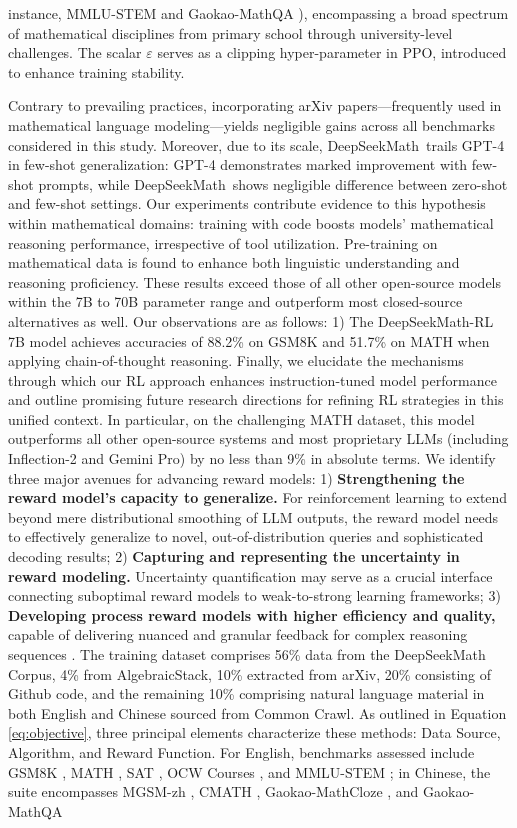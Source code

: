 \begin{algorithm}[t]
\begin{algorithmic}[1]
instance, MMLU-STEM \citep{mmlu} and Gaokao-MathQA \citep{agieval}), encompassing a broad spectrum of mathematical disciplines from primary school through university-level challenges. The scalar $\varepsilon$ serves as a clipping hyper-parameter in PPO, introduced to enhance training stability. \item Contrary to prevailing practices, incorporating arXiv papers—frequently used in mathematical language modeling—yields negligible gains across all benchmarks considered in this study. Moreover, due to its scale, DeepSeekMath~trails GPT-4 in few-shot generalization: GPT-4 demonstrates marked improvement with few-shot prompts, while DeepSeekMath~shows negligible difference between zero-shot and few-shot settings. Our experiments contribute evidence to this hypothesis within mathematical domains: training with code boosts models’ mathematical reasoning performance, irrespective of tool utilization. Pre-training on mathematical data is found to enhance both linguistic understanding and reasoning proficiency. These results exceed those of all other open-source models within the 7B to 70B parameter range and outperform most closed-source alternatives as well. Our observations are as follows: 1) The DeepSeekMath-RL 7B model achieves accuracies of 88.2\% on GSM8K and 51.7\% on MATH when applying chain-of-thought reasoning. Finally, we elucidate the mechanisms through which our RL approach enhances instruction-tuned model performance and outline promising future research directions for refining RL strategies in this unified context. In particular, on the challenging MATH dataset, this model outperforms all other open-source systems and most proprietary LLMs (including Inflection-2 and Gemini Pro) by no less than 9\% in absolute terms. We identify three major avenues for advancing reward models: 1) \textbf{Strengthening the reward model’s capacity to generalize.} For reinforcement learning to extend beyond mere distributional smoothing of LLM outputs, the reward model needs to effectively generalize to novel, out-of-distribution queries and sophisticated decoding results; 2) \textbf{Capturing and representing the uncertainty in reward modeling.} Uncertainty quantification may serve as a crucial interface connecting suboptimal reward models to weak-to-strong learning frameworks; 3) \textbf{Developing process reward models with higher efficiency and quality,} capable of delivering nuanced and granular feedback for complex reasoning sequences \citep{lightman2023let,wang2023math}. The training dataset comprises 56\% data from the DeepSeekMath Corpus, 4\% from AlgebraicStack, 10\% extracted from arXiv, 20\% consisting of Github code, and the remaining 10\% comprising natural language material in both English and Chinese sourced from Common Crawl. As outlined in Equation \ref{eq:objective}, three principal elements characterize these methods: Data Source, Algorithm, and Reward Function. For English, benchmarks assessed include GSM8K \citep{gsm8k}, MATH \citep{MATH}, SAT \citep{llemma}, OCW Courses \citep{minerva}, and MMLU-STEM \citep{mmlu}; in Chinese, the suite encompasses MGSM-zh \citep{mgsm}, CMATH \citep{wei2023cmath}, Gaokao-MathCloze \citep{agieval}, and Gaokao-MathQA 
\end{algorithmic}
\end{algorithm}
